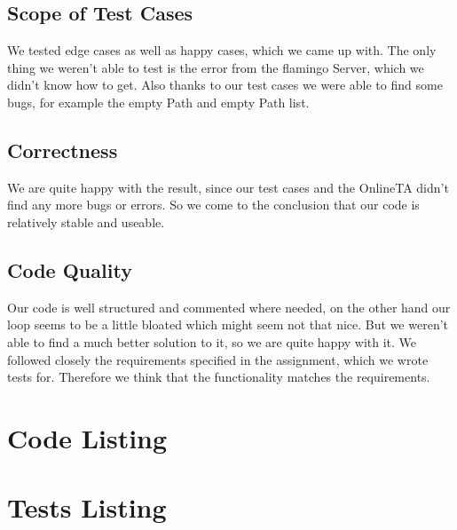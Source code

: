\documentclass[12pt,a4paper]{article}
\begin{document}
\subsection{Scope of Test Cases}
We tested edge cases as well as happy cases, which we came up with.
The only thing we weren't able to test is the error from the flamingo Server, which we didn't know how to get.
Also thanks to our test cases we were able to find some bugs, for example the empty Path and empty Path list.

\subsection{Correctness}
We are quite happy with the result, since our test cases and the OnlineTA didn't find any more bugs or errors.
So we come to the conclusion that our code is relatively stable and useable.

\subsection{Code Quality}
Our code is well structured and commented where needed, on the other hand our loop seems to be a little bloated which might seem not that nice. But we weren't able to find a much better solution to it, so we are quite happy with it.
We followed closely the requirements specified in the assignment, which we wrote tests for. Therefore we think that the functionality matches the requirements.


\appendix
\section{Code Listing}

\section{Tests Listing}
\end{document}
